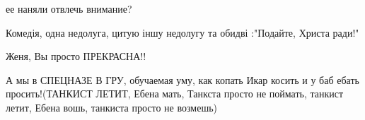 \begin{itemize}
 
ее наняли отвлечь внимание?

 
Комедія, одна недолуга, цитую іншу недолугу та обидві :"Подайте, Христа ради!" \Laughey[1.0][white]

 
Женя, Вы просто ПРЕКРАСНА!!

 

А мы в СПЕЦНАЗЕ В ГРУ, обучаемая уму, как копать Икар косить и у баб ебать
просить!(ТАНКИСТ ЛЕТИТ, Ебена мать, Танкста просто не поймать, танкист летит, Ебена
вошь, танкиста просто не возмешь)

 


\end{itemize}
